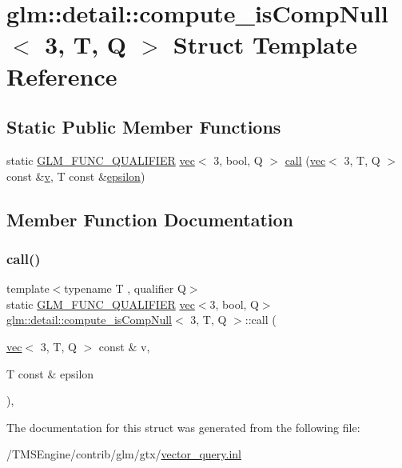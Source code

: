 \hypertarget{structglm_1_1detail_1_1compute__is_comp_null_3_013_00_01_t_00_01_q_01_4}{}\section{glm\+:\+:detail\+:\+:compute\+\_\+is\+Comp\+Null$<$ 3, T, Q $>$ Struct Template Reference}
\label{structglm_1_1detail_1_1compute__is_comp_null_3_013_00_01_t_00_01_q_01_4}
\subsection*{Static Public Member Functions}
\begin{DoxyCompactItemize}
\item 
static \hyperlink{setup_8hpp_a33fdea6f91c5f834105f7415e2a64407}{G\+L\+M\+\_\+\+F\+U\+N\+C\+\_\+\+Q\+U\+A\+L\+I\+F\+I\+ER} \hyperlink{structglm_1_1vec}{vec}$<$ 3, bool, Q $>$ \hyperlink{structglm_1_1detail_1_1compute__is_comp_null_3_013_00_01_t_00_01_q_01_4_a2bb0d3fb0e8d0a8c9e4571e92102f1c3}{call} (\hyperlink{structglm_1_1vec}{vec}$<$ 3, T, Q $>$ const \&\hyperlink{_s_d_l__opengl_8h_a10a82eabcb59d2fcd74acee063775f90}{v}, T const \&\hyperlink{group__gtc__constants_ga2a1e57fc5592b69cfae84174cbfc9429}{epsilon})
\end{DoxyCompactItemize}


\subsection{Member Function Documentation}
\mbox{\label{structglm_1_1detail_1_1compute__is_comp_null_3_013_00_01_t_00_01_q_01_4_a2bb0d3fb0e8d0a8c9e4571e92102f1c3}} 
\subsubsection{\texorpdfstring{call()}{call()}}
{\footnotesize\ttfamily template$<$typename T , qualifier Q$>$ \\
static \hyperlink{setup_8hpp_a33fdea6f91c5f834105f7415e2a64407}{G\+L\+M\+\_\+\+F\+U\+N\+C\+\_\+\+Q\+U\+A\+L\+I\+F\+I\+ER} \hyperlink{structglm_1_1vec}{vec}$<$3, bool, Q$>$ \hyperlink{structglm_1_1detail_1_1compute__is_comp_null}{glm\+::detail\+::compute\+\_\+is\+Comp\+Null}$<$ 3, T, Q $>$\+::call (\begin{DoxyParamCaption}\item[{\hyperlink{structglm_1_1vec}{vec}$<$ 3, T, Q $>$ const \&}]{v,  }\item[{T const \&}]{epsilon }\end{DoxyParamCaption})\hspace{0.3cm}{\ttfamily [inline]}, {\ttfamily [static]}}



The documentation for this struct was generated from the following file\+:\begin{DoxyCompactItemize}
\item 
/\+T\+M\+S\+Engine/contrib/glm/gtx/\hyperlink{vector__query_8inl}{vector\+\_\+query.\+inl}\end{DoxyCompactItemize}
